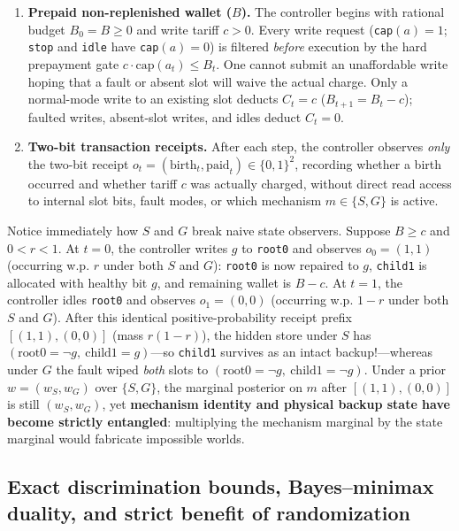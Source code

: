 \documentclass[11pt,a4paper]{article}
\providecommand{\tightlist}{\setlength{\itemsep}{2pt}\setlength{\parskip}{0pt}}
\begin{document}
\begin{enumerate}
\def\labelenumi{\arabic{enumi}.}
\tightlist
\item
  \textbf{Prepaid non-replenished wallet (\(B\)).} The controller begins
  with rational budget \(B_0 = B \ge 0\) and write tariff \(c > 0\).
  Every write request (\texttt{cap}\((a) = 1\); \texttt{stop} and
  \texttt{idle} have \texttt{cap}\((a) = 0\)) is filtered \emph{before}
  execution by the hard prepayment gate
  \(c \cdot \mathrm{cap}(a_t) \le B_t\). One cannot submit an
  unaffordable write hoping that a fault or absent slot will waive the
  actual charge. Only a normal-mode write to an existing slot deducts
  \(C_t = c\) (\(B_{t+1} = B_t - c\)); faulted writes, absent-slot
  writes, and idles deduct \(C_t = 0\).
\item
  \textbf{Two-bit transaction receipts.} After each step, the controller
  observes \emph{only} the two-bit receipt
  \(o_t = (\mathrm{birth}_t, \mathrm{paid}_t) \in \{0,1\}^2\), recording
  whether a birth occurred and whether tariff \(c\) was actually
  charged, without direct read access to internal slot bits, fault
  modes, or which mechanism \(m \in \{S, G\}\) is active.
\end{enumerate}

Notice immediately how \(S\) and \(G\) break naive state observers.
Suppose \(B \ge c\) and \(0 < r < 1\). At \(t=0\), the controller writes
\(g\) to \texttt{root0} and observes \(o_0 = (1, 1)\) (occurring w.p.
\(r\) under both \(S\) and \(G\)): \texttt{root0} is now repaired to
\(g\), \texttt{child1} is allocated with healthy bit \(g\), and
remaining wallet is \(B - c\). At \(t=1\), the controller idles
\texttt{root0} and observes \(o_1 = (0, 0)\) (occurring w.p. \(1-r\)
under both \(S\) and \(G\)). After this identical positive-probability
receipt prefix \([(1,1), (0,0)]\) (mass \(r(1-r)\)), the hidden store
under \(S\) has \((\mathrm{root0} = \neg g,\ \mathrm{child1} = g)\)---so
\texttt{child1} survives as an intact backup!---whereas under \(G\) the
fault wiped \emph{both} slots to
\((\mathrm{root0} = \neg g,\ \mathrm{child1} = \neg g)\). Under a prior
\(w = (w_S, w_G)\) over \(\{S, G\}\), the marginal posterior on \(m\)
after \([(1,1), (0,0)]\) is still \((w_S, w_G)\), yet \textbf{mechanism
identity and physical backup state have become strictly entangled}:
multiplying the mechanism marginal by the state marginal would fabricate
impossible worlds.

\subsection{Exact discrimination bounds, Bayes--minimax duality, and
strict benefit of
randomization}\label{exact-discrimination-bounds-bayesminimax-duality-and-strict-benefit-of-randomization}
\end{document}
